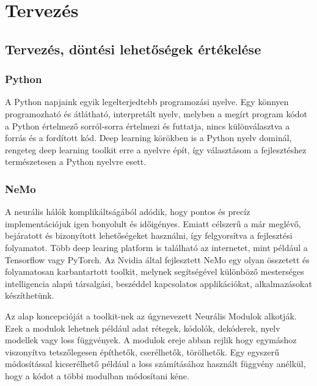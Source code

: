\chapter{Tervezés}

\section{Tervezés, döntési lehetőségek értékelése}

\subsection{Python}

A Python napjaink egyik legelterjedtebb programozási nyelve. Egy könnyen programozható és átlátható, interpretált nyelv, melyben a megírt program kódot a Python értelmező sorról-sorra értelmezi és futtatja, nincs különválasztva a forrás és a fordított kód. Deep learning körökben is a Python nyelv dominál, rengeteg deep learning toolkit erre a nyelvre épít, így választásom a fejlesztéshez természetesen a Python nyelvre esett.

\subsection{NeMo}

A neurális hálók komplikáltságából adódik, hogy pontos és precíz implementációjuk igen bonyolult és időigényes. Emiatt célszerű a már meglévő, bejáratott és bizonyított lehetőségeket használni, így felgyorsítva a fejlesztési folyamatot. Több deep learing platform is található az internetet, mint például a Tensorflow vagy PyTorch. Az Nvidia által fejlesztett NeMo egy olyan összetett és folyamatosan karbantartott toolkit, melynek segítségével különböző mesterséges intelligencia alapú társalgási, beszéddel kapcsolatos applikációkat, alkalmazásokat készíthetünk.


Az alap koncepcióját a toolkit-nek az úgynevezett Neurális Modulok alkotják. Ezek a modulok lehetnek például adat rétegek, kódolók, dekóderek, nyelv modellek vagy loss függvények. A modulok ereje abban rejlik hogy egymáshoz viszonyítva tetszőlegesen építhetők, cserélhetők, törölhetők. Egy egyszerű módosítással kicserélhető például a loss számításához használt függvény anélkül, hogy a kódot a többi modulban módosítani kéne.

